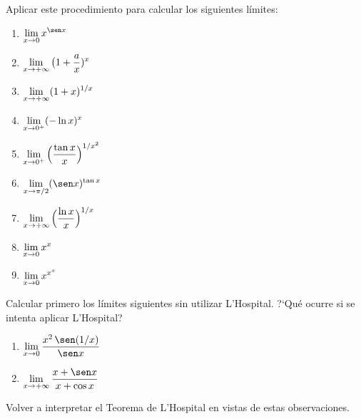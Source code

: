 Aplicar este procedimiento para calcular los siguientes límites:
\begin{multicols}{2}
  \begin{enumerate}
    \item $\D \lim_{x\to 0}x^{\sen x}$
    \item $\displaystyle \lim_{x\to +\infty}\big(1+\frac ax)^x$
    \item $\displaystyle \lim_{x\to +\infty}(1+x)^{1/x}$
    \item $\displaystyle \lim_{x\to 0^+} (-\ln x)^x$
    \item $\displaystyle \lim_{x\to 0^+} \Big(\frac{\tan x}x\Big)^{1/x^2} $
    \item $\D \lim_{x\to \pi/2} (\sen x)^{\tan x}$
    \item $\displaystyle \lim_{x\to +\infty} \Big(\frac{\ln x}{x}\Big)^{1/x}$
    \item $\displaystyle \lim_{x\to 0} x^x$
    \item $\displaystyle \lim_{x\to 0} x^{x^x}$
  \end{enumerate}
\end{multicols}

\item Calcular primero los límites siguientes sin utilizar L'Hospital.
?`Qué ocurre si se intenta aplicar L'Hospital?
\begin{multicols}{2}
  \begin{enumerate}
    \item $\D \lim_{x\to 0}\frac{x^2\,\sen(1/x)}{\sen x}$
    \item $\D \lim_{x\to +\infty}\frac{x+\sen x}{x+\cos x}$
  \end{enumerate}
\end{multicols}
Volver a interpretar el Teorema de L'Hospital en vistas de estas observaciones.

